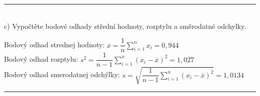 \documentclass[pdftex, 11pt, a4paper, titlepage]{article}
\begin{document}
    \noindent\rule{\linewidth}{0.4pt}\\

    \noindent
    c) Vypočtěte bodové odhady střední hodnoty, rozptylu a směrodatné odchylky.

    \noindent
    Bodový odhad strednej hodnoty: $ \overline{x} = \dfrac{1}{n} \sum\limits_{i=1}^{n} x_i = 0,944 $ \\
    \noindent
    Bodový odhad rozptylu: $ s^2 = \dfrac{1}{n-1} \sum\limits_{i=1}^{n} (x_i - \overline{x})^2 = 1,027 $ \\
    \noindent
    Bodový odhad smerodatnej odchýľky: $ s = \sqrt{\dfrac{1}{n-1} \sum\limits_{i=1}^{n} (x_i - \overline{x})^2} = 1,0134 $ \\
    \noindent\rule{\linewidth}{0.4pt}\\
\end{document}
